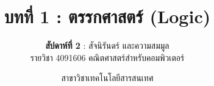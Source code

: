 
\renewcommand{\footchaptertitle}{บทที่ 1 ตรรกศาสตร์ (สัปดาห์ที่ 2)}

\title{\textbf{บทที่ 1 : ตรรกศาสตร์ (Logic)}}
\subtitle{\textbf{สัปดาห์ที่ 2} : สัจนิรันดร์ และความสมมูล \\ รายวิชา 4091606 คณิตศาสตร์สำหรับคอมพิวเตอร์}
\author{สาขาวิชาเทคโนโลยีสารสนเทศ}
\date{}





